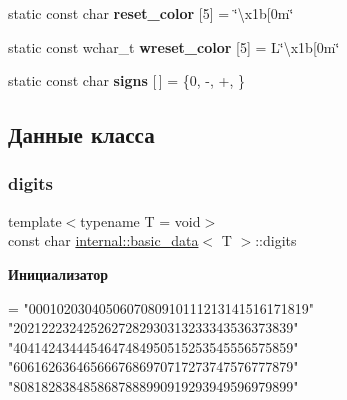\begin{DoxyCompactItemize}
\item 
\mbox{\label{structinternal_1_1basic__data_a079c6fce96a2f63f4e96aa8d65ef7b5f}} 
static const char {\bfseries reset\+\_\+color} \mbox{[}5\mbox{]} = \char`\"{}\textbackslash{}x1b\mbox{[}0m\char`\"{}
\item 
\mbox{\label{structinternal_1_1basic__data_ad840ca5ff1d5b4d754ecea1b46d34501}} 
static const wchar\+\_\+t {\bfseries wreset\+\_\+color} \mbox{[}5\mbox{]} = L\char`\"{}\textbackslash{}x1b\mbox{[}0m\char`\"{}
\item 
\mbox{\label{structinternal_1_1basic__data_a1345cb0b3f04f131c62fe2ac418dfd80}} 
static const char {\bfseries signs} \mbox{[}$\,$\mbox{]} = \{0, \textquotesingle{}-\/\textquotesingle{}, \textquotesingle{}+\textquotesingle{}, \textquotesingle{} \textquotesingle{}\}
\end{DoxyCompactItemize}


\subsection{Данные класса}
\mbox{\label{structinternal_1_1basic__data_aac1d31043025e15e817ec4a8e9071908}} 
\subsubsection{\texorpdfstring{digits}{digits}}
{\footnotesize\ttfamily template$<$typename T = void$>$ \\
const char \hyperlink{structinternal_1_1basic__data}{internal\+::basic\+\_\+data}$<$ T $>$\+::digits\hspace{0.3cm}{\ttfamily [static]}}

{\bfseries Инициализатор}
\begin{DoxyCode}
=
    \textcolor{stringliteral}{"0001020304050607080910111213141516171819"}
    \textcolor{stringliteral}{"2021222324252627282930313233343536373839"}
    \textcolor{stringliteral}{"4041424344454647484950515253545556575859"}
    \textcolor{stringliteral}{"6061626364656667686970717273747576777879"}
    \textcolor{stringliteral}{"8081828384858687888990919293949596979899"}
\end{DoxyCode}
\mbox{\label{structinternal_1_1basic__data_a7d28089dfcffe91b6e88dc811a594b27}} 
